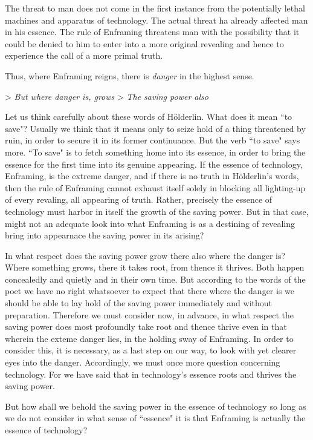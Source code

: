 The threat to man does not come in the first instance from the potentially lethal machines and apparatus of technology. The actual threat ha already affected man in his essence. The rule of Enframing threatens man with the possibility that it could be denied to him to enter into a more original revealing and hence to experience the call of a more primal truth.

Thus, where Enframing reigns, there is \textit{danger} in the highest sense.

> \textit{But where danger is, grows}
> \textit{The saving power also}

Let us think carefully about these words of H\"{o}lderlin. What does it mean ``to save"? Usually we think that it means only to seize hold of a thing threatened by ruin, in order to secure it in its former continuance. But the verb ``to save" says more. ``To save" is to fetch something home into its essence, in order to bring the essence for the first time into its genuine appearing. If the essence of technology, Enframing, is the extreme danger, and if there is no truth in H\"{o}lderlin's words, then the rule of Enframing cannot exhaust itself solely in blocking all lighting-up of every revaling, all appearing of truth. Rather, precisely the essence of technology must harbor in itself the growth of the saving power. But in that case, might not an adequate look into what Enframing is as a destining of revealing bring into appearnace the saving power in its arising? 

In what respect does the saving power grow there also where the danger is? Where something grows, there it takes root, from thence it thrives. Both happen concealedly and quietly and in their own time. But according to the words of the poet we have no right whatsoever to expect that there where the danger is we should be able to lay hold of the saving power immediately and without preparation. Therefore we must consider now, in advance, in what respect the saving power does most profoundly take root and thence thrive even in that wherein the exteme danger lies, in the holding sway of Enframing. In order to consider this, it is necessary, as a last step on our way, to look with yet clearer eyes into the danger. Accordingly, we must once more question concerning technology. For we have said that in technology's essence roots and thrives the saving power.

But how shall we behold the saving power in the essence of technology so long as we do not consider in what sense of ``essence" it is that Enframing is actually the essence of technology?

